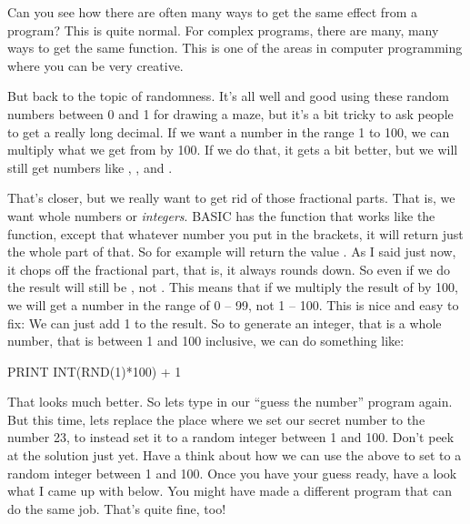 
Can you see how there are often many ways to get the same effect from
a program? This is quite normal. For complex programs, there are
many, many ways to get the same function.  This is one of the areas
in computer programming where you can be very creative.

But back to the topic of randomness. It's all well and good using
these random numbers between 0 and 1 for drawing a maze, but it's a
bit tricky to ask people to get a really long decimal.  If we want a
number in the range 1 to 100, we can multiply what we get from
 by 100. If we do that, it gets a bit better, but we will
still get numbers like , ,
 and .

\needspace{3cm}
That's closer, but we really want to get rid of those fractional
parts. That is, we want whole numbers or {\em integers}.  BASIC has
the  function that works like the  function,
except that whatever number you put in the brackets, it will return
just the whole part of that.  So for example  will
return the value . As I said just now, it chops off the
fractional part, that is, it always rounds down. So even if we do
 the result will still be , not .
This means that if we multiply the result of  by 100, we
will get a number in the range of 0 -- 99, not 1 -- 100. This is nice
and easy to fix: We can just add 1 to the result.  So to generate an
integer, that is a whole number, that is between 1 and 100 inclusive,
we can do something like:

\begin{screenoutput}
  PRINT INT(RND(1)*100) + 1
\end{screenoutput}

\needspace{3cm}
That looks much better. So lets type in our ``guess the number''
program again. But this time, lets replace the place where we set
our secret number to the number 23, to instead set it to a random
integer between 1 and 100.  Don't peek at the solution just yet. Have a
think about how we can use the above to set  to a random
integer between 1 and 100.  Once you have your guess ready, have a
look what I came up with below. You might have made a different
program that can do the same job. That's quite fine, too!

